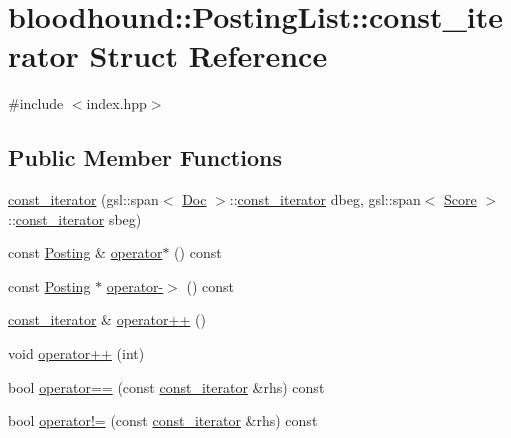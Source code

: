\hypertarget{structbloodhound_1_1PostingList_1_1const__iterator}{}\section{bloodhound\+:\+:Posting\+List\+:\+:const\+\_\+iterator Struct Reference}
\label{structbloodhound_1_1PostingList_1_1const__iterator}


{\ttfamily \#include $<$index.\+hpp$>$}

\subsection*{Public Member Functions}
\begin{DoxyCompactItemize}
\item 
\mbox{\hyperlink{structbloodhound_1_1PostingList_1_1const__iterator_acdd2e534f35cf6e082cc9d126b36f3b4}{const\+\_\+iterator}} (gsl\+::span$<$ \mbox{\hyperlink{structbloodhound_1_1Doc}{Doc}} $>$\+::\mbox{\hyperlink{structbloodhound_1_1PostingList_1_1const__iterator}{const\+\_\+iterator}} dbeg, gsl\+::span$<$ \mbox{\hyperlink{structbloodhound_1_1Score}{Score}} $>$\+::\mbox{\hyperlink{structbloodhound_1_1PostingList_1_1const__iterator}{const\+\_\+iterator}} sbeg)
\item 
const \mbox{\hyperlink{structbloodhound_1_1Posting}{Posting}} \& \mbox{\hyperlink{structbloodhound_1_1PostingList_1_1const__iterator_a0e64366185c712b9f399c4bf31ff804d}{operator$\ast$}} () const
\item 
const \mbox{\hyperlink{structbloodhound_1_1Posting}{Posting}} $\ast$ \mbox{\hyperlink{structbloodhound_1_1PostingList_1_1const__iterator_a04f6e78b6434e52526d5cc28ca3ca24a}{operator-\/$>$}} () const
\item 
\mbox{\hyperlink{structbloodhound_1_1PostingList_1_1const__iterator}{const\+\_\+iterator}} \& \mbox{\hyperlink{structbloodhound_1_1PostingList_1_1const__iterator_ab50270b2e0e133f6e026b330c83f2fe3}{operator++}} ()
\item 
void \mbox{\hyperlink{structbloodhound_1_1PostingList_1_1const__iterator_af53d73fb2485b8d05622c646833891bc}{operator++}} (int)
\item 
bool \mbox{\hyperlink{structbloodhound_1_1PostingList_1_1const__iterator_a7826592d30cee67d4af4fbda6f089fc8}{operator==}} (const \mbox{\hyperlink{structbloodhound_1_1PostingList_1_1const__iterator}{const\+\_\+iterator}} \&rhs) const
\item 
bool \mbox{\hyperlink{structbloodhound_1_1PostingList_1_1const__iterator_a65b36dcc2e29d9d2f67859a795b9d318}{operator!=}} (const \mbox{\hyperlink{structbloodhound_1_1PostingList_1_1const__iterator}{const\+\_\+iterator}} \&rhs) const
\end{DoxyCompactItemize}
